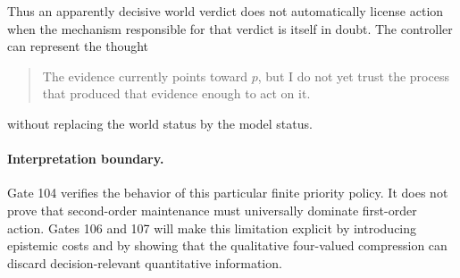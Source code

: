 Thus an apparently decisive world verdict does not automatically license action when the mechanism responsible for that verdict is itself in doubt. The controller can represent the thought
\begin{quote}
The evidence currently points toward $p$, but I do not yet trust the process that produced that evidence enough to act on it.
\end{quote}
without replacing the world status by the model status.

\paragraph{Interpretation boundary.}
Gate 104 verifies the behavior of this particular finite priority policy. It does not prove that second-order maintenance must universally dominate first-order action. Gates 106 and 107 will make this limitation explicit by introducing epistemic costs and by showing that the qualitative four-valued compression can discard decision-relevant quantitative information.
